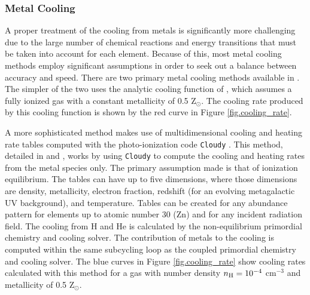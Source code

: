 \subsubsection{Metal Cooling}

A proper treatment of the cooling from metals is significantly more
challenging due to the large number of chemical reactions and energy
transitions that must be taken into account for each element.  Because
of this, most metal cooling methods employ significant assumptions in
order to seek out a balance between accuracy and speed.  There are two
primary metal cooling methods available in \enzo.  The simpler of the
two uses the analytic cooling function of \citet{SW87}, which assumes
a fully ionized gas with a constant metallicity of 0.5 Z$_{\odot}$.
The cooling rate produced by this cooling function is shown by the red 
curve in Figure \ref{fig.cooling_rate}.

A more sophisticated method makes use of multidimensional cooling and
heating rate tables computed with the photo-ionization code
\texttt{Cloudy} \citep{1998PASP..110..761F}.  This method, detailed in
\citet{2008MNRAS.385.1443S} and \citet{2011ApJ...731....6S}, works by
using \texttt{Cloudy} to compute the cooling and heating rates from
the metal species only.  The primary assumption made is that of
ionization equilibrium.  The tables can have up to five dimensions,
where those dimensions are density, metallicity, electron fraction,
redshift (for an evolving metagalactic UV background), and
temperature.  Tables can be created for any abundance pattern for
elements up to atomic number 30 (Zn) and for any incident radiation
field.  The cooling from H and He is calculated by the non-equilibrium
primordial chemistry and cooling solver.  The contribution of metals
to the cooling is computed within the same subcycling loop as the
coupled primordial chemistry and cooling solver.  The blue curves in
Figure \ref{fig.cooling_rate} show cooling rates calculated with this
method for a gas with number density $n_{\rm H} = 10^{-4}$ cm$^{-3}$ and
metallicity of 0.5 Z$_{\odot}$.


